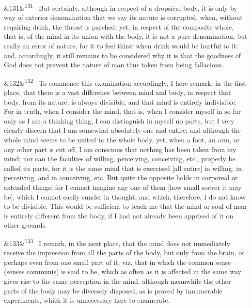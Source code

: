 \documentclass[12pt]{article}
\newcommand{\para}[1][]{\par\noindent\ifx&#1&\else\textsuperscript{\footnotesize #1}~\fi}
\begin{document}
\para[131] But certainly, although in respect of a dropsical body, it is only by way of exterior denomination that we say its nature is corrupted, when, without requiring drink, the throat is parched; yet, in respect of the composite whole, that is, of the mind in its union with the body, it is not a pure denomination, but really an error of nature, for it to feel thirst when drink would be hurtful to it: and, accordingly, it still remains to be considered why it is that the goodness of God does not prevent the nature of man thus taken from being fallacious.

\para[132] To commence this examination accordingly, I here remark, in the first place, that there is a vast difference between mind and body, in respect that body, from its nature, is always divisible, and that mind is entirely indivisible. For in truth, when I consider the mind, that is, when I consider myself in so far only as I am a thinking thing, I can distinguish in myself no parts, but I very clearly discern that I am somewhat absolutely one and entire; and although the whole mind seems to be united to the whole body, yet, when a foot, an arm, or any other part is cut off, I am conscious that nothing has been taken from my mind; nor can the faculties of willing, perceiving, conceiving, etc., properly be called its parts, for it is the same mind that is exercised [all entire] in willing, in perceiving, and in conceiving, etc. But quite the opposite holds in corporeal or extended things; for I cannot imagine any one of them [how small soever it may be], which I cannot easily sunder in thought, and which, therefore, I do not know to be divisible. This would be sufficient to teach me that the mind or soul of man is entirely different from the body, if I had not already been apprised of it on other grounds.

\para[133] I remark, in the next place, that the mind does not immediately receive the impression from all the parts of the body, but only from the brain, or perhaps even from one small part of it, viz, that in which the common sense (senses communis) is said to be, which as often as it is affected in the same way gives rise to the same perception in the mind, although meanwhile the other parts of the body may be diversely disposed, as is proved by innumerable experiments, which it is unnecessary here to enumerate.
\end{document}

